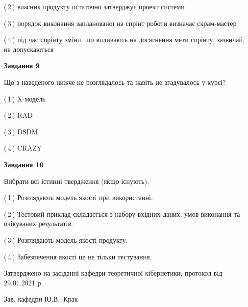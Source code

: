 \documentclass[10pt, ukrainian]{article}
\begin{document}
{\begin {large}
(\,2\,) власник продукту остаточно затверджує проект системи%



(\,3\,) порядок виконання запланованої на спрінт роботи визначає скрам-мастер%



(\,4\,) під час спрінту зміни, що впливають на досягнення мети спрінту, зазвичай, не допускаються%


{\begin {center}\textbf{Завдання 9}\end {center}}\par
Що з наведеного нижче не розглядалось та навіть не згадувалось у курсі?\par
\vspace{2mm}



(\,1\,) X-модель%



(\,2\,) RAD%



(\,3\,) DSDM%



(\,4\,) CRAZY%


{\begin {center}\textbf{Завдання 10}\end {center}}\par
Вибрати всі істинні твердження (якщо існують).\par
\vspace{2mm}



(\,1\,) Розглядають модель якості при використанні.%



(\,2\,) Тестовий приклад складається з набору вхідних даних, умов виконання та очікуваних результатів.%



(\,3\,) Розглядають модель якості продукту.%



(\,4\,) Забезпечення якості це не тільки тестування.%



\end {large}}
{\vspace{5mm}\smallskip \begin {small} Затверджено на засіданні кафедри теоретичної кібернетики, протокол  від   29.01.2021 р.\par\smallskip\smallskip
{\parbox {6.5 cm}{Зав. кафедри \dotfill Ю.В.~Крак}} \end{small}}
\newpage
\end{document}
